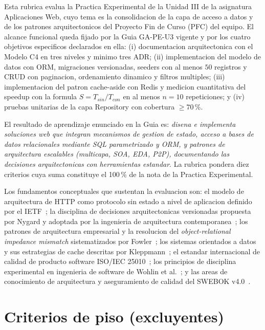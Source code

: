 \documentclass[11pt,a4paper]{article}
\begin{document}
Esta rubrica evalua la Practica Experimental de la Unidad III de la asignatura Aplicaciones Web, cuyo tema es la consolidacion de la capa de acceso a datos y de los patrones arquitectonicos del Proyecto Fin de Curso (PFC) del equipo. El alcance funcional queda fijado por la Guia GA-PE-U3 vigente y por los cuatro objetivos especificos declarados en ella: (i) documentacion arquitectonica con el Modelo C4 en tres niveles y minimo tres ADR; (ii) implementacion del modelo de datos con ORM, migraciones versionadas, seeders con al menos $50$ registros y CRUD con paginacion, ordenamiento dinamico y filtros multiples; (iii) implementacion del patron cache-aside con Redis y medicion cuantitativa del speedup con la formula $S = T_{sin}/T_{con}$ en al menos $n=10$ repeticiones; y (iv) pruebas unitarias de la capa Repository con cobertura $\geq 70$\,\%.

El resultado de aprendizaje enunciado en la Guia es: \emph{disena e implementa soluciones web que integran mecanismos de gestion de estado, acceso a bases de datos relacionales mediante SQL parametrizado y ORM, y patrones de arquitectura escalables (multicapa, SOA, EDA, P2P), documentando las decisiones arquitectonicas con herramientas estandar}. La rubrica pondera diez criterios cuya suma constituye el 100\,\% de la nota de la Practica Experimental.

Los fundamentos conceptuales que sustentan la evaluacion son: el modelo de arquitectura de HTTP como protocolo sin estado a nivel de aplicacion definido por el IETF~\cite{fielding2014http}; la disciplina de decisiones arquitectonicas versionadas propuesta por Nygard y adoptada por la ingenieria de arquitectura contemporanea~\cite{nygard2011adr,brown2023c4,bass2021software,richards2020fundamentals}; los patrones de arquitectura empresarial y la resolucion del \emph{object-relational impedance mismatch} sistematizados por Fowler~\cite{fowler2002patterns}; los sistemas orientados a datos y sus estrategias de cache descritas por Kleppmann~\cite{kleppmann2017designing}; el estandar internacional de calidad de producto software ISO/IEC 25010~\cite{iso25010}; los principios de disciplina experimental en ingenieria de software de Wohlin et al.~\cite{wohlin2012experimentation}; y las areas de conocimiento de arquitectura y aseguramiento de calidad del SWEBOK v4.0~\cite{washizaki2024swebok}.

\section{Criterios de piso (excluyentes)}
\end{document}
